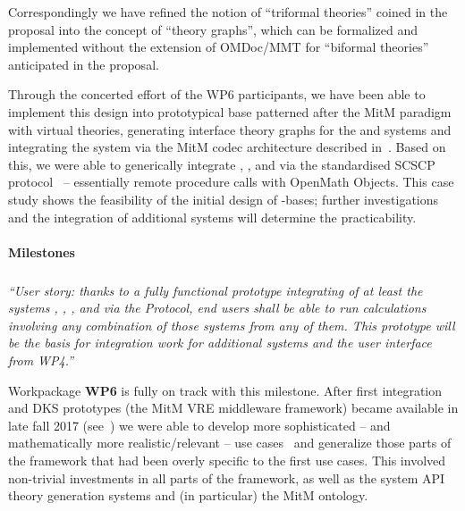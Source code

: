 Correspondingly we have refined the notion of ``triformal theories'' coined in the proposal into the concept of ``\DKS theory graphs'', which can be formalized and implemented without the extension of OMDoc/MMT for ``biformal theories'' anticipated in the proposal.

Through the concerted effort of the WP6 participants, we have been able to implement this design into prototypical \DKS base patterned after the MitM paradigm with virtual theories, generating interface theory graphs for the \GAP and \Sage systems and integrating the \LMFDB system via the MitM codec architecture described in~\cite{ODK-D6.2}.
Based on this, we were able to generically integrate \GAP, \Sage, and \LMFDB via the standardised SCSCP protocol~\cite{HorRoz:ossp09} -- essentially remote procedure calls with OpenMath Objects.
This case study shows the feasibility of the initial design of \DKS-bases; further investigations and the integration of additional systems will determine the practicability.

\paragraph{Milestones}

\subparagraph{}
\emph{“User story: thanks to a fully functional prototype integrating of at least the systems \GAP, \Sage, \Singular, and \LMFDB via the \SCSCP Protocol, end users shall be able to run calculations involving any combination of those systems from any of them.
  This prototype will be the basis for integration work for additional systems and the user interface from WP4.”}
\medskip

Workpackage \textbf{WP6} is fully on track with this milestone.
After first integration and DKS prototypes (the MitM VRE middleware  framework) became available in late fall 2017 (see~\cite{KohMuePfe:kbimss17,WieKohRab:vtuimkb17}) we were able to develop more sophisticated -- and mathematically more realistic/relevant -- use cases~\cite{CreLow:mdcmds18} and generalize those parts of the framework that had been overly specific to the first use cases.
This involved non-trivial investments in all parts of the framework, as well as the system API theory generation systems and (in particular) the MitM ontology. 

